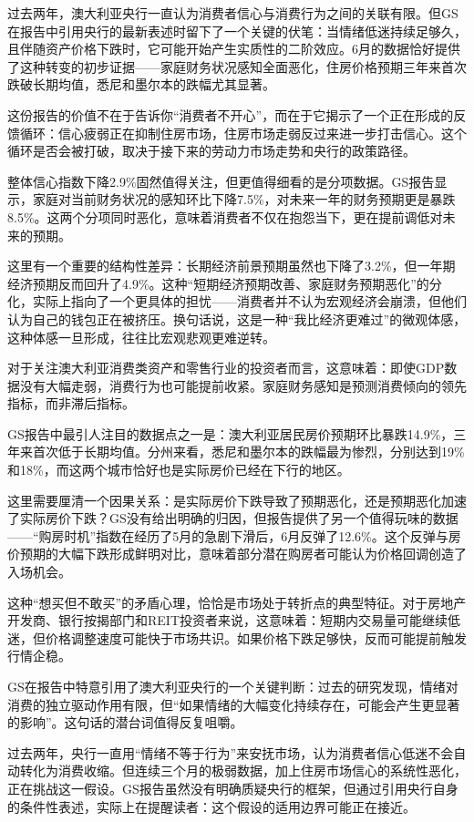\documentclass[11pt]{ctexart}
\begin{document}
过去两年，澳大利亚央行一直认为消费者信心与消费行为之间的关联有限。但GS在报告中引用央行的最新表述时留下了一个关键的伏笔：当情绪低迷持续足够久，且伴随资产价格下跌时，它可能开始产生实质性的二阶效应。6月的数据恰好提供了这种转变的初步证据——家庭财务状况感知全面恶化，住房价格预期三年来首次跌破长期均值，悉尼和墨尔本的跌幅尤其显著。

这份报告的价值不在于告诉你“消费者不开心”，而在于它揭示了一个正在形成的反馈循环：信心疲弱正在抑制住房市场，住房市场走弱反过来进一步打击信心。这个循环是否会被打破，取决于接下来的劳动力市场走势和央行的政策路径。

整体信心指数下降2.9\%固然值得关注，但更值得细看的是分项数据。GS报告显示，家庭对当前财务状况的感知环比下降7.5\%，对未来一年的财务预期更是暴跌8.5\%。这两个分项同时恶化，意味着消费者不仅在抱怨当下，更在提前调低对未来的预期。

这里有一个重要的结构性差异：长期经济前景预期虽然也下降了3.2\%，但一年期经济预期反而回升了4.9\%。这种“短期经济预期改善、家庭财务预期恶化”的分化，实际上指向了一个更具体的担忧——消费者并不认为宏观经济会崩溃，但他们认为自己的钱包正在被挤压。换句话说，这是一种“我比经济更难过”的微观体感，这种体感一旦形成，往往比宏观悲观更难逆转。

对于关注澳大利亚消费类资产和零售行业的投资者而言，这意味着：即使GDP数据没有大幅走弱，消费行为也可能提前收紧。家庭财务感知是预测消费倾向的领先指标，而非滞后指标。

GS报告中最引人注目的数据点之一是：澳大利亚居民房价预期环比暴跌14.9\%，三年来首次低于长期均值。分州来看，悉尼和墨尔本的跌幅最为惨烈，分别达到19\%和18\%，而这两个城市恰好也是实际房价已经在下行的地区。

这里需要厘清一个因果关系：是实际房价下跌导致了预期恶化，还是预期恶化加速了实际房价下跌？GS没有给出明确的归因，但报告提供了另一个值得玩味的数据——“购房时机”指数在经历了5月的急剧下滑后，6月反弹了12.6\%。这个反弹与房价预期的大幅下跌形成鲜明对比，意味着部分潜在购房者可能认为价格回调创造了入场机会。

这种“想买但不敢买”的矛盾心理，恰恰是市场处于转折点的典型特征。对于房地产开发商、银行按揭部门和REIT投资者来说，这意味着：短期内交易量可能继续低迷，但价格调整速度可能快于市场共识。如果价格下跌足够快，反而可能提前触发行情企稳。

GS在报告中特意引用了澳大利亚央行的一个关键判断：过去的研究发现，情绪对消费的独立驱动作用有限，但“如果情绪的大幅变化持续存在，可能会产生更显著的影响”。这句话的潜台词值得反复咀嚼。

过去两年，央行一直用“情绪不等于行为”来安抚市场，认为消费者信心低迷不会自动转化为消费收缩。但连续三个月的极弱数据，加上住房市场信心的系统性恶化，正在挑战这一假设。GS报告虽然没有明确质疑央行的框架，但通过引用央行自身的条件性表述，实际上在提醒读者：这个假设的适用边界可能正在接近。
\end{document}
